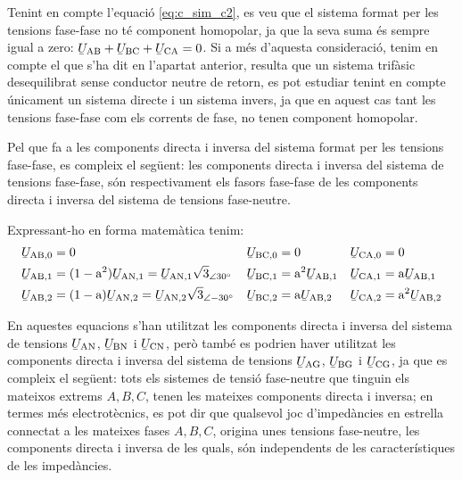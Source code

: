 \begin{center}
    
    \label{pic:Comp_sim_tens}
\end{center}

Tenint en compte l'equació \eqref{eq:c_sim_c2}, es veu que el sistema
format per les tensions fase-fase no té component homopolar, ja que
la seva suma  és sempre igual a zero: $\cmplx{U}\ped{AB} +
\cmplx{U}\ped{BC} + \cmplx{U}\ped{CA} = 0$. Si a més
d'aquesta consideració, tenim en compte el que s'ha dit en l'apartat
anterior, resulta que un sistema trifàsic desequilibrat sense conductor
neutre de retorn, es pot estudiar tenint en compte únicament un sistema directe
i un sistema invers, ja que en aquest cas tant les tensions fase-fase com els
corrents de fase, no tenen component homopolar.

Pel que fa a les components directa i inversa del sistema format per
les tensions fase-fase, es compleix el següent: les components
directa i inversa del sistema de tensions fase-fase, són
respectivament els fasors fase-fase de les components directa i
inversa del sistema de tensions fase-neutre.

Expressant-ho en forma matemàtica tenim:
\begin{subequations}
\begin{align}
   \cmplx{U}\ped{AB,0} &= 0 &
   \cmplx{U}\ped{BC,0} &= 0 &
   \cmplx{U}\ped{CA,0} &= 0 \\
   \cmplx{U}\ped{AB,1} &= (1-\au^2) \cmplx{U}\ped{AN,1} =
   \cmplx{U}\ped{AN,1} \sqrt{3}_{\angle\ang{30}} &
   \cmplx{U}\ped{BC,1} &= \au^2 \cmplx{U}\ped{AB,1} &
   \cmplx{U}\ped{CA,1} &= \au \cmplx{U}\ped{AB,1} \label{eq:c_sim_a3} \\
   \cmplx{U}\ped{AB,2} &= (1-\au) \cmplx{U}\ped{AN,2}  =
   \cmplx{U}\ped{AN,2} \sqrt{3}_{\angle\ang{-30}}&
   \cmplx{U}\ped{BC,2} &= \au \cmplx{U}\ped{AB,2} &
   \cmplx{U}\ped{CA,2} &= \au^2 \cmplx{U}\ped{AB,2} \label{eq:c_sim_b3}
\end{align}
\end{subequations}

En aquestes equacions s'han utilitzat les components directa i
inversa del sistema de tensions
$\cmplx{U}\ped{AN}$, $\cmplx{U}\ped{BN}$ i $\cmplx{U}\ped{CN}$,
però també es podrien haver utilitzat les components directa i
inversa del sistema de tensions
$\cmplx{U}\ped{AG}$, $\cmplx{U}\ped{BG}$ i $\cmplx{U}\ped{CG}$,
ja que es compleix el següent: tots els sistemes de tensió
fase-neutre que tinguin els mateixos extrems $A, B,
C$, tenen les mateixes components directa i inversa; en termes
més electrotècnics, es pot dir que qualsevol joc d'impedàncies en
estrella connectat a les mateixes fases $A, B, C$,
origina unes tensions fase-neutre, les components directa i inversa
de les quals, són independents de les característiques de les
impedàncies.

